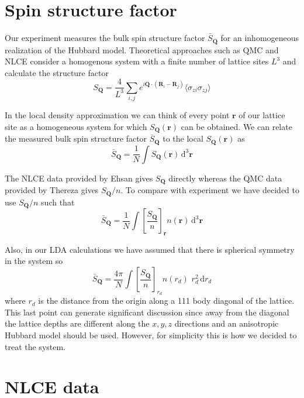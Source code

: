 \documentclass[11pt,letter]{article}
\newcommand{\bv}[1]{\ensuremath{\bm{#1}}}
\begin{document}
\section{ Spin structure factor }

Our experiment measures the bulk spin structure factor $\bar{S}_{\bv{Q}}$ for
an inhomogeneous realization of the Hubbard model.  Theoretical approaches such
as QMC and NLCE consider a homogenous system with a finite number of lattice
sites $L^{3}$ and  calculate the structure factor 
\begin{equation} 
    S_{\bv{Q}} = \frac{4}{L^{3}} \sum_{i,j} 
     e^{i\bv{Q}\cdot ( \bv{R}_{i} - \bv{R}_{j} )} \langle \sigma_{zi} \sigma_{zj}  \rangle
\end{equation}

In the local density approximation we can think of every point $\bv{r}$ of our
lattice site as a homogeneous system for which $S_{\bv{Q}}(\bv{r})$ can be
obtained.  We can relate the measured bulk spin structure factor
$\bar{S}_{\bv{Q}}$ to the local $S_{\bv{Q}}(\bv{r})$ as
\begin{equation}
  \bar{S}_{\bv{Q}}  = \frac{1}{N} \int  S_{\bv{Q}}(\bv{r}) \, \mathrm{d}^{3} \bv{r}
\end{equation}

The NLCE data provided by Ehsan gives $S_{\bv{Q}}$ directly whereas the QMC
data provided by Thereza gives $S_{\bv{Q}}/n$.  To compare with experiment we
have decided to use $S_{\bv{Q}}/n$ such that  
\begin{equation}
  \bar{S}_{\bv{Q}}  = \frac{1}{N} 
   \int \left[ \frac{  S_{\bv{Q}} }{n} \right]_{\bv{r}}
    n(\bv{r})  \, \mathrm{d}^{3} \bv{r}
\end{equation}

Also, in our LDA calculations we have assumed that there is spherical symmetry
in the system so 
\begin{equation}
  \bar{S}_{\bv{Q}}  = \frac{4\pi}{N} 
   \int \left[ \frac{  S_{\bv{Q}} }{n} \right]_{r_{d}}
    n(r_{d}) \,\, r_{d}^{2}   \, \mathrm{d}r_{d}
\end{equation}
where $r_{d}$ is the distance from the origin along a 111 body diagonal of the
lattice.  This last point can generate significant discussion since  away from
the diagonal the lattice depths are different along the $x,y,z$ directions and
an anisotropic Hubbard model should be used. However, for simplicity this is
how we decided to treat the system. 

\section{ NLCE data }
\end{document}
